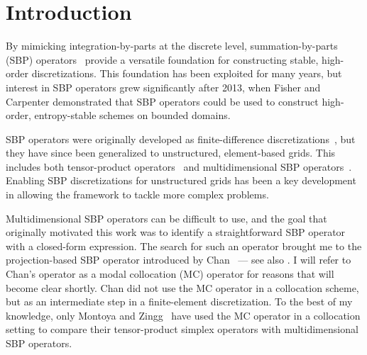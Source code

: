 \documentclass[pdflatex,sn-mathphys-num]{sn-jnl}%
\theoremstyle{thmstyleone}%
\theoremstyle{thmstyletwo}%
\theoremstyle{thmstylethree}%
\begin{document}
\section{Introduction}\label{sec:intro}

By mimicking integration-by-parts at the discrete level, summation-by-parts (SBP) operators~\cite{Kreiss1974finite} provide a versatile foundation for constructing stable, high-order discretizations.  This foundation has been exploited for many years, but interest in SBP operators grew significantly after 2013, when Fisher and Carpenter \cite{Fisher2013highorder} demonstrated that SBP operators could be used to construct high-order, entropy-stable schemes on bounded domains.

SBP operators were originally developed as finite-difference discretizations~\cite{Kreiss1974finite}, but they have since been generalized to unstructured, element-based grids.  This includes both tensor-product operators~\cite{Gassner2013skew,Carpenter2014entropy} and multidimensional SBP operators~\cite{Hicken2016multidimensional}.  Enabling SBP discretizations for unstructured grids has been a key development in allowing the framework to tackle more complex problems.



Multidimensional SBP operators can be difficult to use, and the goal that originally motivated this work was to identify a straightforward SBP operator with a closed-form expression.  The search for such an operator brought me to the projection-based SBP operator introduced by Chan~\cite{Chan2018discretely} --- see also \cite{Chan2019skew}.  I will refer to Chan's operator as a modal collocation (MC) operator for reasons that will become clear shortly.  Chan did not use the MC operator in a collocation scheme, but as an intermediate step in a finite-element discretization.  To the best of my knowledge, only Montoya and Zingg~\cite{Montoya2024efficient} have used the MC operator in a collocation setting to compare their tensor-product simplex operators with multidimensional SBP operators.
\end{document}
